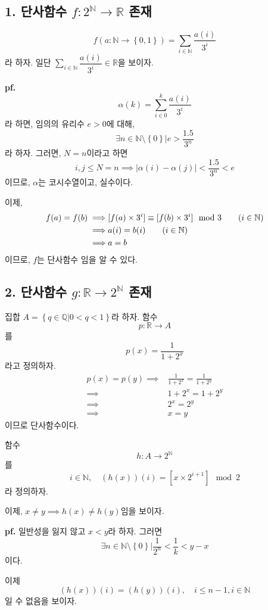 \documentclass{article}
\begin{document}
\subsection{1. 단사함수 $f : 2^{\mathbb{N}} \rightarrow \mathbb{R}$ 존재}
$$f(a : \mathbb{N} \rightarrow \left\{0, 1\right\}) = \sum_{i\in \mathbb{N}} {\frac{a(i)}{3^i}}$$
라 하자. 일단 $\sum_{i\in \mathbb{N}} {\dfrac{a(i)}{3^i}} \in \mathbb{R}$을 보이자.

\textbf{pf.} 
$$\alpha(k) = \sum_{i \in 0}^{k} {\frac{a(i)}{3^i}}$$라 하면, 임의의 유리수 $e > 0$에 대해, 
$$\exists n \in \mathbb{N} \setminus \left\{0\right\} \bigg| e > \frac{1.5}{3^n}$$라 하자.
그러면, $N = n$이라고 하면
$$i, j \le N = n \implies \left|\alpha(i) - \alpha(j)\right| < \frac{1.5}{3^n} < e$$
이므로, $\alpha$는 코시수열이고, 실수이다.

이제,
\begin{align*}
f(a) = f(b) \implies& [f(a) \times 3^i] \equiv [f(b) \times 3^i] \mod 3 \tag{$i \in \mathbb{N}$} 
\\ \implies& a(i) = b(i) \tag{$ i \in \mathbb{N}$}
\\ \implies& a = b
\end{align*}
이므로, $f$는 단사함수 임을 알 수 있다.

\subsection{2. 단사함수 $g : \mathbb{R} \rightarrow 2^{\mathbb{N}}$ 존재}
집합 $A = \left\{q \in \mathbb{Q} \bigg| 0 < q < 1 \right\}$라 하자.
함수
$$p : \mathbb{R} \rightarrow A$$
를 $$p(x) = \frac{1}{1 + 2^x}$$라고 정의하자. 
\begin{align*}
p(x) = p(y) \implies& \frac{1}{1 + 2^x} = \frac{1}{1 + 2^y}
\\ \implies& 1 + 2^x = 1 + 2^y
\\ \implies& 2^x = 2^y
\\ \implies& x = y
\end{align*}이므로 단사함수이다.

함수
$$h : A \rightarrow 2^{\mathbb{N}}$$
를 $$i \in \mathbb{N}, \quad (h(x))(i) = [x \times 2^{i+1}] \mod 2$$라 정의하자.

이제, $x \neq y \implies h(x) \neq h(y)$임을 보이자.

\textbf{pf.} 일반성을 잃지 않고 $x < y$라 하자. 그러면
$$\exists n \in \mathbb{N} \setminus \left\{0\right\} \bigg| \frac{1}{2^n} < \frac{1}{k} < y-x$$
이다.

이제 $$(h(x))(i) = (h(y))(i), \quad i \le n-1, i \in \mathbb{N} $$일 수 없음을 보이자.
\end{document}

